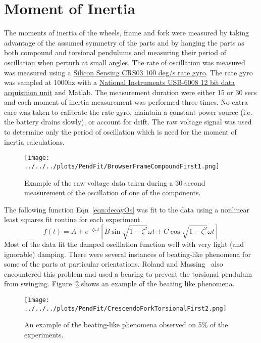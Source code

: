 \documentclass{bmd2010p}
\begin{document}
\section{Moment of Inertia}
The moments of inertia of the wheels, frame and fork were measured by taking
advantage of the assumed symmetry of the parts and by hanging the parts as both
compound and torsional pendulums and measuring their period of oscillation when
perturb at small angles. The rate of oscillation was measured was measured
using a \href{http://www.siliconsensing.com/CRS03}{Silicon Sensing CRS03 100
deg/s rate gyro}. The rate gyro was sampled at
1000hz with a
\href{http://sine.ni.com/nips/cds/view/p/lang/en/nid/14604}{National
Instruments USB-6008 12 bit data acquisition unit} and
Matlab. The measurement duration were either 15 or 30 secs and each moment of
inertia measurement was performed three times. No extra care was taken to
calibrate the rate gyro, maintain a constant power source (i.e. the battery
drains slowly), or account for drift. The raw voltage signal was used to
determine only the period of oscillation which is need for the moment of inertia
calculations.
\begin{figure}[tbp]
    \begin{center}
        \texttt{[image: ../../../plots/PendFit/BrowserFrameCompoundFirst1.png]}
    \end{center}
    \caption{Example of the raw voltage data taken during a 30 second
    measurement of the oscillation of one of the components.}
    \label{fig:voltage}
\end{figure}
The following function Eqn~\ref{eqn:decayOs} was fit to the data using a nonlinear least squares fit
routine for each experiment.
\begin{equation}
    f(t) = A + e^{-\zeta\omega t}\left[B\sin{\sqrt{1-\zeta^2}\omega t} +
    C\cos{\sqrt{1-\zeta^2}\omega t}\right]
    \label{eqn:decayOs}
\end{equation}
Most of the data fit the damped oscillation function well with very light (and
ignorable) damping. There were several instances of beating-like phenomena for
some of the parts at particular orientations. Roland and
Massing~\cite{Roland1971} also encountered this problem and used a bearing to
prevent the torsional pendulum from swinging. Figure~\ref{fig:beating} shows an
example of the beating like phenomena.
\begin{figure}[htpb]
    \begin{center}
        \texttt{[image: ../../../plots/PendFit/CrescendoForkTorsionalFirst2.png]}
    \end{center}
    \caption{An example of the beating-like phenomena observed on 5\% of the
    experiments.}
    \label{fig:beating}
\end{figure}
\end{document}
